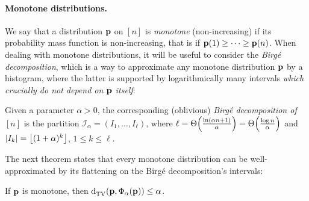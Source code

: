 \paragraph{Monotone distributions.}
We say that a distribution $\D$ on $[n]$ is \emph{monotone} (non-increasing) if its probability mass function is non-increasing, that is if $\D(1)\geq \dots \geq \D(n)$. 
When dealing with monotone distributions, it will be useful to consider the \emph{Birg\'e decomposition}, which is a way to approximate any monotone distribution $\D$ by a histogram, where the latter is supported by logarithmically many intervals \emph{which crucially do not depend on $\D$ itself}:
\begin{definition}\label{def:birge:decomposition}
  Given a parameter $\alpha>0$, the corresponding (oblivious) \emph{Birg\'e decomposition of $[n]$} is the partition $\mathcal{I}_\alpha=(I_1,\dots,I_\ell)$, where $\ell=\bigTheta{\frac{\ln( \alpha n + 1)}{\alpha}}=\bigTheta{\frac{\log n }{\alpha}}$ and $\abs{I_{k}}=\flr{(1+\alpha)^k}$, $1\leq k \leq \ell$. 
\end{definition}

The next theorem states that every monotone distribution can be well-approximated by its flattening on the Birg\'e decomposition's intervals:     
\begin{theorem}\label{theorem:Birge:obl:decomp}
 If $\D$ is monotone, then $\totalvardist{\D}{\birge[\D]{\alpha}} \leq \alpha$.
\end{theorem}

